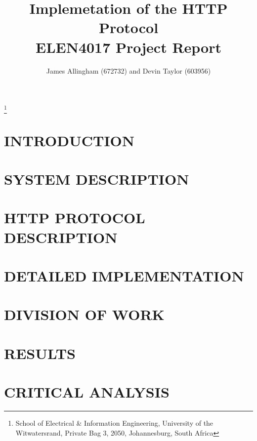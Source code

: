 \documentclass[10pt,twocolumn]{witseiepaper}
\begin{document}
\title{Implemetation of the HTTP Protocol \\ ELEN4017 Project Report}

\author{James Allingham (672732) and Devin Taylor (603956)}
\thanks{School of Electrical \& Information Engineering, University of the
Witwatersrand, Private Bag 3, 2050, Johannesburg, South Africa}



\abstract{}

\keywords{}


\maketitle

\section{INTRODUCTION}

\section{SYSTEM DESCRIPTION}

\section{HTTP PROTOCOL DESCRIPTION}

\section{DETAILED IMPLEMENTATION}

\section{DIVISION OF WORK}

\section{RESULTS}

\section{CRITICAL ANALYSIS}
\end{document}
